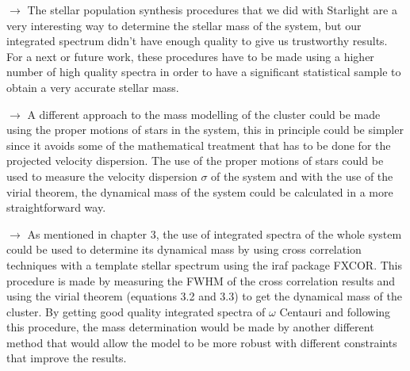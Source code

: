 $\rightarrow$ The stellar population synthesis procedures that we did with Starlight are a very interesting way to determine the stellar mass of the system, but our integrated spectrum didn't have enough quality to give us trustworthy results. For a next or future work, these procedures have to be made using a higher number of high quality spectra in order to have a significant statistical sample to obtain a very accurate stellar mass.

$\rightarrow$ A different approach to the mass modelling of the cluster could be made using the proper motions of stars in the system, this in principle could be simpler since it avoids some of the mathematical treatment that has to be done for the projected velocity dispersion. The use of the proper motions of stars could be used to measure the velocity dispersion $\sigma$ of the system and with the use of the virial theorem, the dynamical mass of the system could be calculated in a more straightforward way.

$\rightarrow$ As mentioned in chapter 3, the use of integrated spectra of the whole system could be used to determine its dynamical mass by using cross correlation techniques with a template stellar spectrum using the iraf package FXCOR. This procedure is made by measuring the FWHM of the cross correlation results and using the virial theorem (equations 3.2 and 3.3) to get the dynamical mass of the cluster. By getting good quality integrated spectra of $\omega$ Centauri and following this procedure, the mass determination would be made by another different method that would allow the model to be more robust with different constraints that improve the results.

